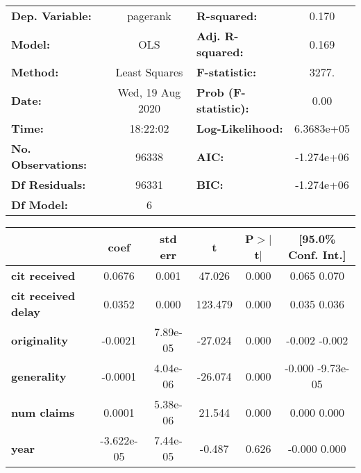 \begin{center}
\begin{tabular}{lclc}
\toprule
\textbf{Dep. Variable:}     &     pagerank     & \textbf{  R-squared:         } &        0.170     \\
\textbf{Model:}             &       OLS        & \textbf{  Adj. R-squared:    } &        0.169     \\
\textbf{Method:}            &  Least Squares   & \textbf{  F-statistic:       } &        3277.     \\
\textbf{Date:}              & Wed, 19 Aug 2020 & \textbf{  Prob (F-statistic):} &        0.00      \\
\textbf{Time:}              &     18:22:02     & \textbf{  Log-Likelihood:    } &    6.3683e+05    \\
\textbf{No. Observations:}  &       96338      & \textbf{  AIC:               } &    -1.274e+06    \\
\textbf{Df Residuals:}      &       96331      & \textbf{  BIC:               } &    -1.274e+06    \\
\textbf{Df Model:}          &           6      & \textbf{                     } &                  \\
\bottomrule
\end{tabular}
\begin{tabular}{lccccc}
                            & \textbf{coef} & \textbf{std err} & \textbf{t} & \textbf{P$>$$|$t$|$} & \textbf{[95.0\% Conf. Int.]}  \\
\midrule
\textbf{cit received}       &       0.0676  &        0.001     &    47.026  &         0.000        &         0.065     0.070       \\
\textbf{cit received delay} &       0.0352  &        0.000     &   123.479  &         0.000        &         0.035     0.036       \\
\textbf{originality}        &      -0.0021  &     7.89e-05     &   -27.024  &         0.000        &        -0.002    -0.002       \\
\textbf{generality}         &      -0.0001  &     4.04e-06     &   -26.074  &         0.000        &        -0.000 -9.73e-05       \\
\textbf{num claims}         &       0.0001  &     5.38e-06     &    21.544  &         0.000        &         0.000     0.000       \\
\textbf{year}               &   -3.622e-05  &     7.44e-05     &    -0.487  &         0.626        &        -0.000     0.000       \\

\end{tabular}
\end{center}
